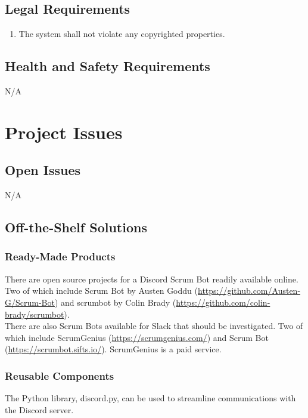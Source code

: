 \documentclass[12pt, titlepage]{article}
\begin{document}
\subsection{Legal Requirements}
\begin{enumerate}[start=1, label={L\arabic*.}]
    \item The system shall not violate any copyrighted properties.
\end{enumerate}

\subsection{Health and Safety Requirements}
N/A

\section{Project Issues}
\subsection{Open Issues}
N/A

\subsection{Off-the-Shelf Solutions}
\subsubsection{Ready-Made Products}
\noindent There are open source projects for a Discord Scrum Bot readily available online. Two of which include Scrum Bot by Austen Goddu (\url{https://github.com/Austen-G/Scrum-Bot}) and scrumbot by Colin Brady (\url{https://github.com/colin-brady/scrumbot}).\\

\noindent There are also Scrum Bots available for Slack that should be investigated. Two of which include ScrumGenius (\url{https://scrumgenius.com/}) and Scrum Bot (\url{https://scrumbot.sifts.io/}). ScrumGenius is a paid service.

\subsubsection{Reusable Components}
\noindent The Python library, discord.py, can be used to streamline communications with the Discord server.
\end{document}
